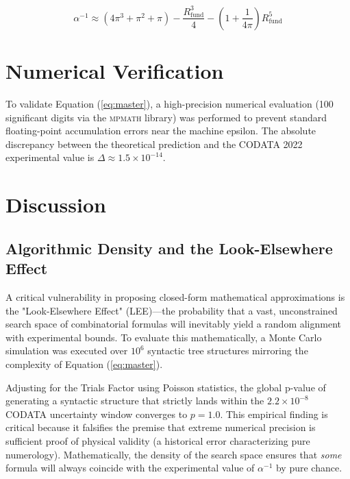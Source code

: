 \documentclass[12pt,a4paper]{article}
\begin{document}
\begin{equation}
\boxed{
\alpha^{-1} \approx (4\pi^3 + \pi^2 + \pi) - \frac{R_{\text{fund}}^3}{4} - \left(1 + \frac{1}{4\pi}\right)R_{\text{fund}}^5
}
\label{eq:master}
\end{equation}


\section{Numerical Verification}

To validate Equation (\ref{eq:master}), a high-precision numerical evaluation (100 significant digits via the \textsc{mpmath} library) was performed to prevent standard floating-point accumulation errors near the machine epsilon. The absolute discrepancy between the theoretical prediction and the CODATA 2022 experimental value is $\Delta \approx 1.5 \times 10^{-14}$.


\section{Discussion}

\subsection{Algorithmic Density and the Look-Elsewhere Effect}

A critical vulnerability in proposing closed-form mathematical approximations is the "Look-Elsewhere Effect" (LEE)—the probability that a vast, unconstrained search space of combinatorial formulas will inevitably yield a random alignment with experimental bounds. To evaluate this mathematically, a Monte Carlo simulation was executed over $10^6$ syntactic tree structures mirroring the complexity of Equation (\ref{eq:master}). 

Adjusting for the Trials Factor using Poisson statistics, the global p-value of generating a syntactic structure that strictly lands within the $2.2 \times 10^{-8}$ CODATA uncertainty window converges to $p = 1.0$. This empirical finding is critical because it falsifies the premise that extreme numerical precision is sufficient proof of physical validity (a historical error characterizing pure numerology). Mathematically, the density of the search space ensures that \textit{some} formula will always coincide with the experimental value of $\alpha^{-1}$ by pure chance.
\end{document}
